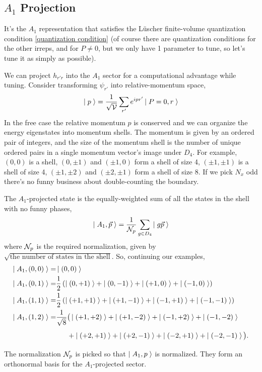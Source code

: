\subsection{$A_1$ Projection}

It's the $A_1$ representation that satisfies the L\"{u}scher finite-volume quantization condition \eqref{quantization condition} (of course there are quantization conditions for the other irreps, and for $P\neq 0$, but we only have 1 parameter to tune, so let's tune it as simply as possible).

We can project $h_{r'r}$ into the $A_1$ sector for a computational advantage while tuning.
Consider transforming $\psi_{r'}$ into relative-momentum space,
\begin{align}
    \left|\;p\;\right\rangle = \frac{1}{\sqrt{\mathcal{V}}}\sum_{r'} e^{ipr'} \left|\;P=0, r\;\right\rangle
\end{align}
In the free case the relative momentum $p$ is conserved and we can organize the energy eigenstates into momentum shells.
The momentum is given by an ordered pair of integers, and the size of the momentum shell is the number of unique ordered pairs in a single momentum vector's image under $D_4$.
For example, $(0,0)$ is a shell, $(0,\pm 1)$ and $(\pm 1, 0)$ form a shell of size 4, $(\pm 1, \pm 1)$ is a shell of size 4, $(\pm 1, \pm 2)$ and $(\pm 2, \pm 1)$ form a shell of size 8.
If we pick $N_x$ odd there's no funny business about double-counting the boundary.

The $A_1$-projected state is the equally-weighted sum of all the states in the shell with no funny phases,
\begin{align}
    \left|\;A_1, \vec{p}\;\right\rangle = \frac{1}{\mathcal{N}_{p}} \sum_{g\in D_4} \left|\;g\vec{p}\;\right\rangle
\end{align}
where $\mathcal{N}_{p}$ is the required normalization, given by $\sqrt{\textrm{the number of states in the shell}}$.
So, continuing our examples,
\begin{align}
    \ket{A_1, (0,0)} =& \ket{(0,0)}
    \\
    \ket{A_1, (0,1)} =& \frac{1}{2}\left(\ket{(0,+1)} + \ket{(0,-1)} + \ket{(+1,0)} + \ket{(-1,0)} \right)
    \\
    \ket{A_1, (1,1)} =& \frac{1}{2}\left(\ket{(+1,+1)} + \ket{(+1,-1)} + \ket{(-1,+1)} + \ket{(-1,-1)} \right)
    \\
    \ket{A_1, (1,2)} =& \frac{1}{\sqrt{8}}\big(\ket{(+1,+2)} + \ket{(+1,-2)} + \ket{(-1,+2)} + \ket{(-1,-2)} \nonumber\\
                     &\phantom{\frac{1}{\sqrt{8}}}+ \ket{(+2,+1)} + \ket{(+2,-1)} + \ket{(-2,+1)} + \ket{(-2,-1)} \big).
\end{align}
The normalization $\mathcal{N}_{p}$ is picked so that $\left|\;A_1, p\;\right\rangle$ is normalized.
They form an orthonormal basis for the $A_1$-projected sector.

